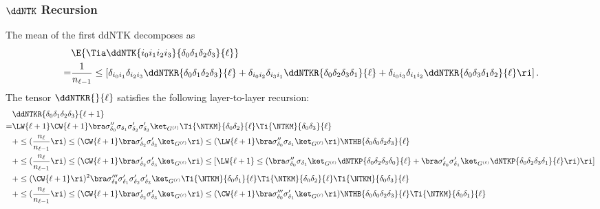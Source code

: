 \subsubsection{$\ddNTK$ Recursion}
The mean of the first ddNTK decomposes as
\begin{align}
&\E{\Tia\ddNTK{i_0i_1i_2i_3}{\delta_0\delta_1\delta_2\delta_3}{\ell}}\, \\
=&\frac{1}{n_{\ell-1}}\le[\delta_{i_0i_1}\delta_{i_2i_3}\ddNTKR{\delta_0\delta_1\delta_2\delta_3}{\ell}+\delta_{i_0i_2}\delta_{i_3i_1}\ddNTKR{\delta_0\delta_2\delta_3\delta_1}{\ell}+\delta_{i_0i_3}\delta_{i_1i_2}\ddNTKR{\delta_0\delta_3\delta_1\delta_2}{\ell}\ri]\, .\notag
\end{align}
The tensor $\ddNTKR{}{\ell}$ satisfies the following layer-to-layer recursion:
\begin{align}\label{eq:R-recursion}\index{ddNTKs!statistics!R-recursion@$R$-recursion}
&\ddNTKR{\delta_0\delta_1\delta_2\delta_3}{\ell+1}\, \\
=&\LW{\ell+1}\CW{\ell+1}\bra\sigma^{\prime\prime}_{\delta_0}\sigma_{\delta_1}\sigma^{\prime}_{\delta_2}\sigma^{\prime}_{\delta_3}\ket_{G^{(\ell)}}\Ti{\NTKM}{\delta_0\delta_2}{\ell}\Ti{\NTKM}{\delta_0\delta_3}{\ell}\, \notag\\
&+\le(\frac{n_{\ell}}{n_{\ell-1}}\ri)\le(\CW{\ell+1}\bra\sigma^{\prime}_{\delta_2}\sigma^{\prime}_{\delta_3}\ket_{G^{(\ell)}}\ri)\le(\LW{\ell+1}\bra\sigma^{\prime\prime}_{\delta_0}\sigma_{\delta_1}\ket_{G^{(\ell)}}\ri)\NTHB{\delta_0\delta_0\delta_2\delta_3}{\ell}\, \notag\\
&+\le(\frac{n_{\ell}}{n_{\ell-1}}\ri)\le(\CW{\ell+1}\bra\sigma^{\prime}_{\delta_2}\sigma^{\prime}_{\delta_3}\ket_{G^{(\ell)}}\ri)\le[\LW{\ell+1}\le(\bra\sigma^{\prime\prime}_{\delta_0}\sigma_{\delta_1}\ket_{G^{(\ell)}}\dNTKP{\delta_0\delta_2\delta_3\delta_0}{\ell}+\bra\sigma^{\prime}_{\delta_0}\sigma^{\prime}_{\delta_1}\ket_{G^{(\ell)}}\dNTKP{\delta_0\delta_2\delta_3\delta_1}{\ell}\ri)\ri]\, \notag\\
&+\le(\CW{\ell+1}\ri)^2\bra\sigma^{\prime\prime\prime}_{\delta_0}\sigma^{\prime}_{\delta_1}\sigma^{\prime}_{\delta_2}\sigma^{\prime}_{\delta_3}\ket_{G^{(\ell)}}\Ti{\NTKM}{\delta_0\delta_1}{\ell}\Ti{\NTKM}{\delta_0\delta_2}{\ell}\Ti{\NTKM}{\delta_0\delta_3}{\ell}\, \notag\\
&+\le(\frac{n_{\ell}}{n_{\ell-1}}\ri)\le(\CW{\ell+1}\bra\sigma^{\prime}_{\delta_2}\sigma^{\prime}_{\delta_3}\ket_{G^{(\ell)}}\ri)\le(\CW{\ell+1}\bra\sigma^{\prime\prime\prime}_{\delta_0}\sigma^{\prime}_{\delta_1}\ket_{G^{(\ell)}}\ri)\NTHB{\delta_0\delta_0\delta_2\delta_3}{\ell}\Ti{\NTKM}{\delta_0\delta_1}{\ell}\, \notag\\

\end{align}
